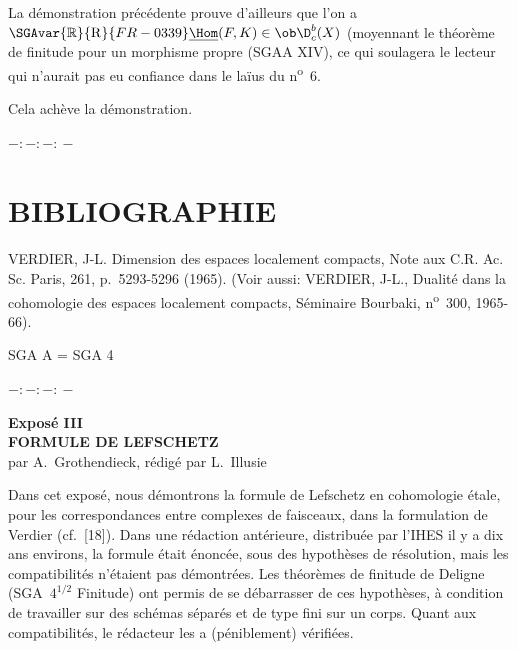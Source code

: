 La démonstration précédente prouve d'ailleurs que l'on a $\SGAvar{\mathbb{R}}{\mathrm{R}}{FR-0339}\underline{\Hom}(F,K)\in\ob\D_c^b(X)$ (moyennant le théorème de finitude pour un morphisme propre (SGAA XIV), ce qui soulagera le lecteur qui n'aurait pas eu confiance dans le laïus du n\textsuperscript{o}~6.

Cela achève la démonstration.

\begin{center}
$-:\!-:\!-:\!-$
\end{center}

\section*{BIBLIOGRAPHIE}

\begin{enumerate}[label={[\arabic*]}]
\item VERDIER, J-L. Dimension des espaces localement compacts, Note aux C.R. Ac. Sc. Paris, 261, p.~5293-5296 (1965). (Voir aussi: VERDIER, J-L., Dualité dans la cohomologie des espaces localement compacts, Séminaire Bourbaki, n\textsuperscript{o}~300, 1965-66).
\end{enumerate}

SGA A = SGA 4

\begin{center}
$-:\!-:\!-:\!-$
\end{center}

\clearpage
\begin{center}
{\Large \textbf{Exposé III}}\\[0.4em]
{\large \textbf{FORMULE DE LEFSCHETZ}}\\[0.3em]
par A.~Grothendieck, rédigé par L.~Illusie
\end{center}
\renewenvironment{statement}[1]{\par\medskip\noindent\textbf{#1}\ }{\par\medskip}
\renewenvironment{prooftext}[1][Proof]{\par\noindent\emph{#1}\ }{\par\medskip}


Dans cet exposé, nous démontrons la formule de Lefschetz en cohomologie étale, pour les correspondances entre complexes de faisceaux, dans la formulation de Verdier (cf.~[18]). Dans une rédaction antérieure, distribuée par l'IHES il y a dix ans environs, la formule était énoncée, sous des hypothèses de résolution, mais les compatibilités  n'étaient pas démontrées. Les théorèmes de finitude de Deligne (SGA~$4^{1/2}$ Finitude) ont permis de se débarrasser de ces hypothèses, à condition de travailler sur des schémas séparés et de type fini sur un corps. Quant aux compatibilités, le rédacteur les a (péniblement) vérifiées.

